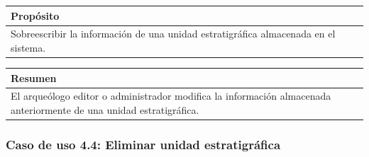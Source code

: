     \begin{table}[H]
        \centering
        \begin{tabularx}{\textwidth}{@{} |L |@{}} \hline
            \textbf{Propósito} \\
            \hline
            Sobreescribir la información de una unidad estratigráfica almacenada en el sistema. \\
            \hline
        \end{tabularx}
    \end{table}

    \begin{table}[H]
        \centering
        \begin{tabularx}{\textwidth}{@{} |L |@{}} \hline
            \textbf{Resumen} \\
            \hline
            El arqueólogo editor o administrador modifica la información almacenada
            anteriormente de una unidad estratigráfica.\\
            \hline
        \end{tabularx}
    \end{table}

\subsubsection{Caso de uso 4.4: Eliminar unidad estratigráfica}

